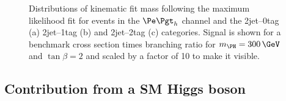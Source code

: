 \begin{figure}
\begin{center}

\end{center}
\caption[Distributions of kinematic fit mass following the maximum likelihood fit for
events in the $\etau$ channel.]{
Distributions of kinematic fit mass following the maximum likelihood fit for
events in the $\etau$ channel and the 2jet--0tag (a) 2jet--1tag (b) 
and 2jet--2tag (c) categories. Signal is shown for a benchmark
cross section times branching ratio for $m_{\PH}=300\,\GeV$ and $\tan\beta=2$
and scaled by a factor of 10 to make it visible.}
\label{fig:PostFitMHetau}
\end{figure} 

\subsection{Contribution from a SM Higgs boson}

